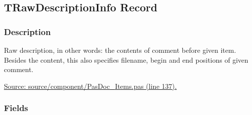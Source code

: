 \documentclass{report}
\begin{document}
\subsection*{TRawDescriptionInfo Record}
\fi
\label{PasDoc_Items.TRawDescriptionInfo}
\subsubsection*{\large{\textbf{Description}}\normalsize\hspace{1ex}\hfill}
Raw description, in other words: the contents of comment before given item. Besides the content, this also specifies filename, begin and end positions of given comment.\par
\href{https://github.com/pasdoc/pasdoc/blob/master/source/component/PasDoc_Items.pas#L137}{Source: source/component/PasDoc{\_}Items.pas (line 137).}\subsubsection*{\large{\textbf{Fields}}\normalsize\hspace{1ex}\hfill}
\end{document}
